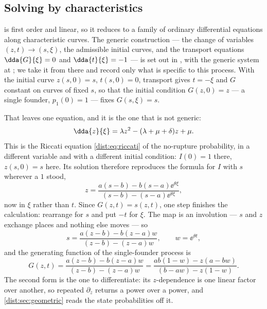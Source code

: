 \subsection{Solving by characteristics}
\label{dist:sec:characteristics}

 is first order and linear, so it reduces to a family of
ordinary differential equations along characteristic curves. The generic
construction --- the change of variables $(z,t)\to(s,\xi)$, the admissible
initial curves, and the transport equations
$\dda{G}{\xi}=0$ and $\dda{t}{\xi}=-1$ --- is set out in
,
with the generic system at
;
we take it from
there and record only what is specific to this process. With the initial curve
$z(s,0)=s$, $t(s,0)=0$, transport gives $t=-\xi$ and $G$ constant on curves of
fixed $s$, so that the initial condition $G(z,0)=z$ --- a single founder,
$p_1(0)=1$ --- fixes $G(s,\xi)=s$.

That leaves one equation, and it is the one that is not generic:
\begin{equation}
\dda{z}{\xi} = \lambda z^2 - (\lambda + \mu + \delta)z + \mu.
\label{dist:eq:zchar}
\end{equation}
This is the Riccati equation \cref{dist:eq:riccati} of the no-rupture
probability, in a different variable and with a different initial condition:
$I(0)=1$ there, $z(s,0)=s$ here. Its solution therefore reproduces the
formula for $I$ with $s$ wherever a $1$ stood,
\begin{equation}
z = \frac{a(s-b) - b(s-a)\ee^{\theta\xi}}{(s-b) - (s-a)\ee^{\theta\xi}},
\label{dist:eq:zsolve}
\end{equation}
now in $\xi$ rather than $t$. Since $G(z,t)=s(z,t)$, one step finishes the
calculation: rearrange for $s$ and put $-t$ for $\xi$. The map is an
involution --- $s$ and $z$ exchange places and nothing else moves --- so
\begin{equation}
s = \frac{a(z-b) - b(z-a)w}{(z-b) - (z-a)w},
\qquad w=\ee^{\theta t},
\label{dist:eq:sinv}
\end{equation}
and the generating function of the single-founder process is
\begin{equation}
G(z,t) = \frac{a(z-b) - b(z-a)w}{(z-b) - (z-a)w}
= \frac{ab(1-w) - z(a-bw)}{(b-aw) - z(1-w)}.
\label{dist:eq:gcat}
\end{equation}
The second form is the one to differentiate: its $z$-dependence is one linear
factor over another, so repeated $\partial_z$ returns a power over a power,
and \cref{dist:sec:geometric} reads the state probabilities off it.

